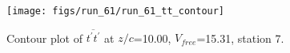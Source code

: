 \begin{figure}[H]
\centering
\texttt{[image: figs/run\_61/run\_61\_tt\_contour]}
\caption{Contour plot of $\overline{t^\prime t^\prime}$ at $z/c$=10.00, $V_{free}$=15.31, station 7.}
\label{fig:run_61_tt_contour}
\end{figure}


